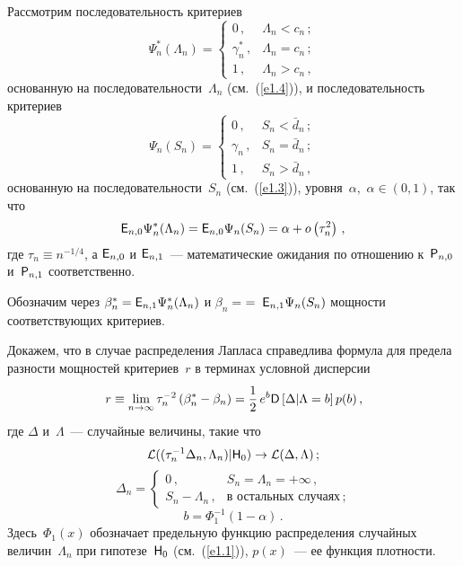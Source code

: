 \begin{multicols}{2}
Рассмотрим последовательность критериев
\begin{equation}
\Psi_n^*(\Lambda_n)=
\begin{cases}
0\,, & \Lambda_n<c_n\,;\\
\gamma_n^*\,, & \Lambda_n=c_n\,;\\
1\,, & \Lambda_n>c_n\,,
\end{cases}
\label{e2.1}
\end{equation}
основанную на последовательности~$\Lambda_n$ (см.~(\ref{e1.4})), и последовательность критериев
\begin{equation*}
\Psi_n(S_n)=
\begin{cases}
0\,, & S_n<\bar d_n\,;\\
\gamma_n\,, & S_n=\bar d_n\,;\\
1\,, & S_n>\bar d_n\,,
\end{cases}
\end{equation*}
основанную на последовательности~$S_n$ (см.~(\ref{e1.3})), уровня~$\alpha,$ $\alpha\in(0,1)$, так что
\begin{equation}
{{\sf E}}_{n,0}\Psi_n^*(\Lambda_n)={{\sf E}}_{n,0}\Psi_n(S_n)=\alpha+ o\left(\tau_n^2\right)\,,
\label{e2.3}
\end{equation}
где $\tau_n\equiv n^{-1/4}$, а ${{\sf E}}_{n,0}$ и ${{\sf E}}_{n,1}$~--- математические ожидания по отношению 
к~${{\sf P}}_{n,0}$ и~${{\sf P}}_{n,1}$ соответственно.

Обозначим через
$\beta_n^*={{\sf E}}_{n,1}\Psi_n^*(\Lambda_n)$ и
$\beta_n=$\linebreak $=\;{{\sf E}}_{n,1}\Psi_n(S_n)$
мощности соответствующих критериев.

Докажем, что в случае распределения Лапласа справедлива формула для предела разности мощностей критериев~$r$ 
в терминах условной дисперсии
\begin{equation}
r\equiv\lim\limits_{n\to\infty}\tau_n^{-2}\left(\beta_n^*-\beta_n\right)=\displaystyle\frac{\displaystyle 1\mathstrut}{\displaystyle 2\mathstrut}\,e^b{{\sf D}}\left[
\Delta \vert \Lambda = b\right] p(b)\,,\!
\label{e2.6}
\end{equation}
где $\Delta$ и~$\Lambda$~--- случайные величины, такие что
\begin{equation*}
{\cal L}((\tau_n^{-1}\Delta_n,\Lambda_n)\vert {\sf H}_0) \to 
{\cal L}(\Delta, \Lambda)\,;
\end{equation*}
\begin{equation}
\Delta_n=
\begin{cases}
0\,, & S_n=\Lambda_n=+\infty\,,\\
S_n-\Lambda_n\,, &\mbox{в остальных случаях}\,;
\end{cases}
\label{e2.8}
\end{equation}
\begin{equation}
b=\Phi_1^{-1}(1-\alpha)\,.
\label{e2.9}
\end{equation}
Здесь~$\Phi_1(x)$ обозначает предельную функцию распределения случайных величин~$\Lambda_n$ 
при гипотезе~${\sf H}_0$ (см.~(\ref{e1.1})), $p(x)$~--- ее функция плотности.


\end{multicols}
